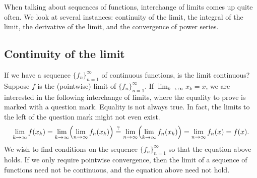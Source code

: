 When talking about sequences of functions, interchange of limits comes up
quite often.  We look at several instances: continuity of the limit, the
integral of the limit, the derivative of the limit, and the convergence of
power series.

\subsection{Continuity of the limit}

If we have a sequence $\{ f_n \}_{n=1}^\infty$ of continuous functions, is the limit continuous?
Suppose $f$ is the (pointwise) limit of $\{ f_n \}_{n=1}^\infty$.
If $\lim_{k\to\infty} x_k = x$,
we are interested in the following
interchange of limits, where the equality to prove
is marked with a question mark.  Equality is not always true.
In fact, the limits to the left
of the question mark might not even exist.
\begin{equation*}
\lim_{k \to \infty} 
f(x_k)
=
\lim_{k \to \infty} 
\Bigl(
\lim_{n \to \infty} f_n(x_k)
\Bigr)
\overset{?}{=}
\lim_{n \to \infty}
\Bigl(
\lim_{k \to \infty} 
f_n(x_k)
\Bigr)
=
\lim_{n \to \infty}
f_n(x)
=
f(x) .
\end{equation*}
We wish to find conditions on the sequence $\{ f_n \}_{n=1}^\infty$
so that the equation above holds.
If we only require pointwise convergence, then the limit
of a sequence of functions need not be continuous, and the equation above
need not hold.

